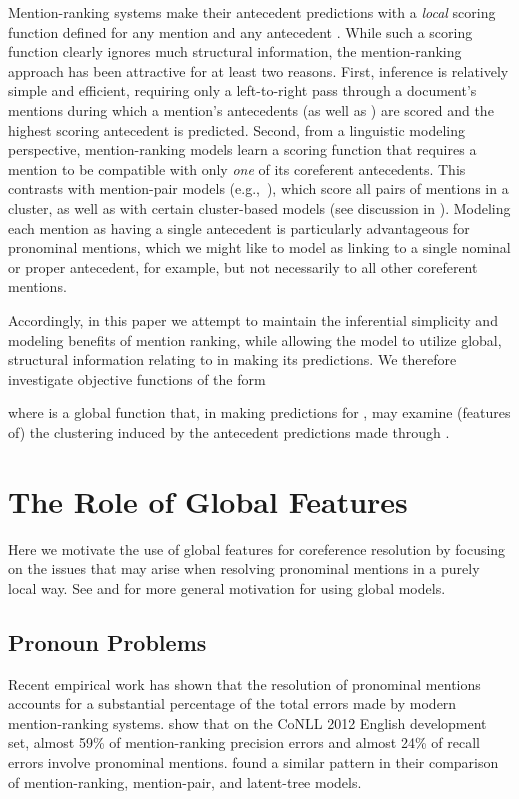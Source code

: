 \documentclass[11pt,letterpaper]{article}
\begin{document}
Mention-ranking systems make their antecedent predictions with a \textit{local} scoring function  defined for any mention  and any antecedent . While such a scoring function clearly ignores much structural information, the mention-ranking approach has been attractive for at least two reasons. First, inference is relatively simple and efficient, requiring only a left-to-right pass through a document's mentions during which a mention's antecedents (as well as ) are scored and the highest scoring antecedent is predicted. Second, from a linguistic modeling perspective, mention-ranking models learn a scoring function that requires a mention  to be compatible with only \textit{one} of its coreferent antecedents. This contrasts with mention-pair models (e.g.,~), which score all pairs of mentions in a cluster, as well as with certain cluster-based models (see discussion in ). Modeling each mention as having a single antecedent is particularly advantageous for pronominal mentions, which we might like to model as linking to a single nominal or proper antecedent, for example, but not necessarily to all other coreferent mentions. 

Accordingly, in this paper we attempt to maintain the inferential simplicity and modeling benefits of mention ranking, while allowing the model to utilize global, structural information relating to  in making its predictions. We therefore investigate objective functions of the form 

\vspace{-5mm}
{\small

}

\vspace{-2mm}
\noindent where  is a global function that, in making predictions for , may examine (features of) the clustering  induced by the antecedent predictions made through . 
 
\section{The Role of Global Features}
\label{sec:isglobalnecessary}
Here we motivate the use of global features for coreference resolution by focusing on the issues that may arise when resolving pronominal mentions in a purely local way. See  and  for more general motivation for using global models.

\subsection{Pronoun Problems}
Recent empirical work has shown that the resolution of pronominal mentions accounts for a substantial percentage of the total errors made by modern mention-ranking systems.  show that on the CoNLL 2012 English development set, almost 59\% of mention-ranking precision errors and almost 24\% of recall errors involve pronominal mentions.  found a similar pattern in their comparison of mention-ranking, mention-pair, and latent-tree models.  
\end{document}
